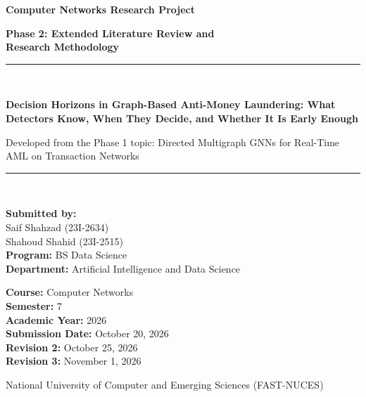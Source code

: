 \documentclass[11pt,a4paper]{article}
\begin{document}
\begin{titlepage}
    \centering
    \vspace*{1.5cm}

    {\huge\bfseries Computer Networks Research Project\par}
    \vspace{0.8cm}
    {\LARGE\bfseries Phase 2: Extended Literature Review and\\Research Methodology\par}
    \vspace{1.2cm}

    \rule{\linewidth}{1.2pt}\\[0.4cm]
    {\Large\bfseries Decision Horizons in Graph-Based Anti-Money Laundering: What Detectors Know, When They Decide, and Whether It Is Early Enough\par}
    \vspace{0.3cm}
    {\normalsize Developed from the Phase 1 topic: Directed Multigraph GNNs for Real-Time AML on Transaction Networks\par}
    \rule{\linewidth}{1.2pt}\\[1.5cm]

    \begin{minipage}{0.48\textwidth}
        \begin{flushleft} \large
            \textbf{Submitted by:}\\[0.2cm]
            Saif Shahzad (23I-2634)\\
            Shahoud Shahid (23I-2515)\\[0.4cm]
            \textbf{Program:} BS Data Science\\
            \textbf{Department:} Artificial Intelligence and Data Science
        \end{flushleft}
    \end{minipage}
    \hfill
    \begin{minipage}{0.48\textwidth}
        \begin{flushright} \large
            \textbf{Course:} Computer Networks\\
            \textbf{Semester:} 7\\
            \textbf{Academic Year:} 2026\\
            \textbf{Submission Date:} October 20, 2026\\
            \textbf{Revision 2:} October 25, 2026\\
            \textbf{Revision 3:} November 1, 2026
        \end{flushright}
    \end{minipage}

    \vfill
    {\large National University of Computer and Emerging Sciences (FAST-NUCES)\par}
    \vspace*{1cm}
\end{titlepage}
\end{document}
